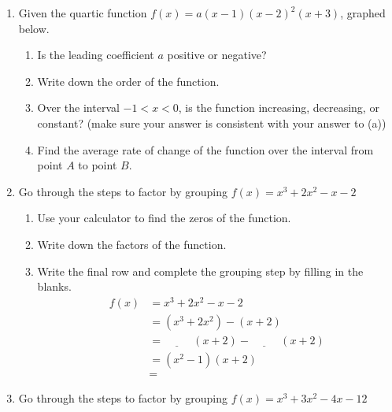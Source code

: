 \documentclass[12pt, twoside]{article}
\begin{document}
\begin{enumerate}
\item Given the quartic function $f(x) = a(x-1)(x-2)^2(x+3)$, graphed below.
\begin{enumerate}[itemsep=1cm]
    \item Is the leading coefficient $a$ positive or negative?
    \item Write down the order of the function.
    \item Over the interval $-1 < x < 0$, is the function increasing, decreasing, or constant? (make sure your answer is consistent with your answer to (a))
    \item Find the average rate of change of the function over the interval from point $A$ to point $B$. \vspace{2cm}
\end{enumerate}
\begin{center}
    \end{center}

\newpage 
\item Go through the steps to factor by grouping $f(x) = x^3+2x^2-x-2$
\begin{enumerate}[itemsep=1cm]
    \item Use your calculator to find the zeros of the function.
    \item Write down the factors of the function.
    \item Write the final row and complete the grouping step by filling in the blanks.
    \begin{align*}
        f(x) &= x^3+2x^2-x-2 \\[0.5cm]
             &= (x^3+2x^2)-(x+2) \\[0.5cm]
             &= \underline{\hspace{1cm}}\;(x+2) - \underline{\hspace{1cm}}\;(x+2) \\[0.5cm]
             &= (x^2-1)(x+2) \\[0.5cm]
             &=
        \end{align*}
\end{enumerate}

\item Go through the steps to factor by grouping $f(x) = x^3+3x^2-4x-12$

\end{enumerate}
\end{document}

